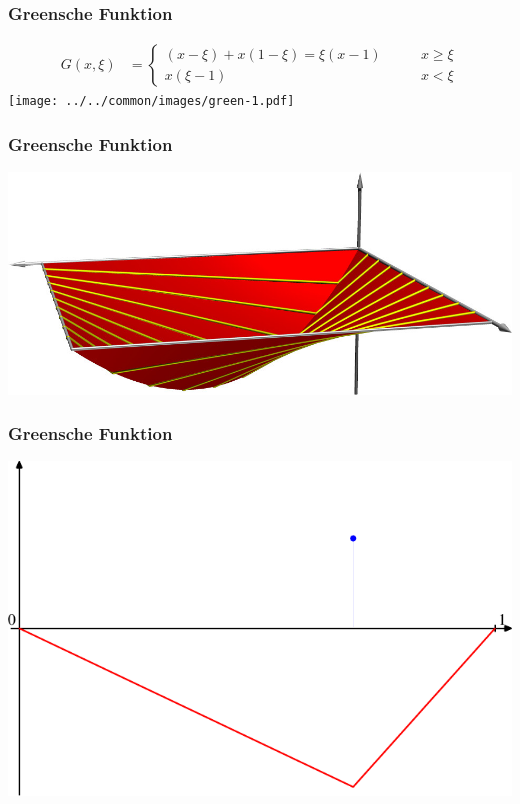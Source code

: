 \begin{frame}
\frametitle{Greensche Funktion}
\begin{align*}
G(x,\xi)
&=
\begin{cases}
(x-\xi) + x(1-\xi) = \xi(x - 1)&\qquad x\ge \xi\\
x(\xi-1)&\qquad x<\xi
\end{cases}
\end{align*}
\texttt{[image: ../../common/images/green-1.pdf]}
\end{frame}

\begin{frame}
\frametitle{Greensche Funktion}
\includegraphics[width=\hsize]{../../common/3d/green.jpg}
\end{frame}

\begin{frame}
\frametitle{Greensche Funktion}
\includegraphics[width=\hsize]{../../common/graphics/green-1.pdf}
\end{frame}

